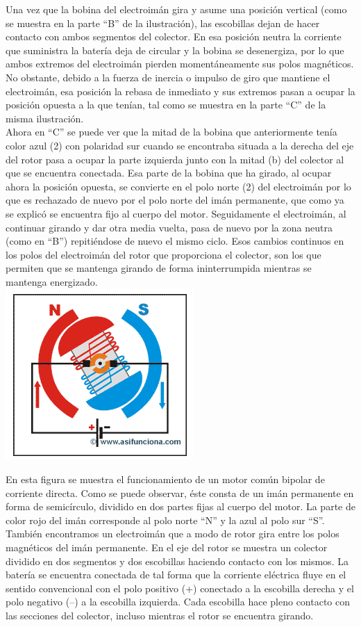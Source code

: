 \documentclass[10pt,a4paper]{article}
\begin{document}
Una vez que la bobina del electroimán gira y asume una posición vertical (como se muestra en la parte “B” de la ilustración), las escobillas dejan de hacer contacto con ambos segmentos del colector. En esa posición neutra la corriente que suministra la batería deja de circular y la bobina se desenergiza, por lo que ambos extremos del electroimán pierden momentáneamente sus polos magnéticos. No obstante, debido a la fuerza de inercia o impulso de giro que mantiene el electroimán, esa posición la rebasa de inmediato y sus extremos pasan a ocupar la posición opuesta a la que tenían, tal como se muestra en la parte “C” de la misma ilustración.\\

Ahora en “C” se puede ver que la mitad de la bobina que anteriormente tenía color azul (2) con polaridad sur cuando se encontraba situada a la derecha del eje del rotor pasa a ocupar la parte izquierda junto con la mitad (b) del colector al que se encuentra conectada. Esa parte de la bobina que ha girado, al ocupar ahora la posición opuesta, se convierte en el polo norte (2) del electroimán por lo que es rechazado de nuevo por el polo norte del imán permanente, que como ya se explicó se encuentra fijo al cuerpo del motor. Seguidamente el electroimán, al continuar girando y dar otra media vuelta, pasa de nuevo por la zona neutra (como en “B”) repitiéndose de nuevo el mismo ciclo. Esos cambios continuos en los polos del electroimán del rotor que proporciona el colector, son los que permiten que se mantenga girando de forma ininterrumpida mientras se mantenga energizado.\\
\centering
\includegraphics[scale=.80]{gi.png}\\
\raggedright
En esta figura se muestra el funcionamiento de un motor común bipolar de corriente directa. Como se puede observar, éste consta de un imán permanente en forma de semicírculo, dividido en dos partes fijas al cuerpo del motor. La parte de color rojo del imán corresponde al polo norte “N” y la azul al polo sur “S”. También encontramos un electroimán que a modo de rotor gira entre los polos magnéticos del imán permanente. En el eje del rotor se muestra un colector dividido en dos segmentos y dos escobillas haciendo contacto con los mismos. La batería se encuentra conectada de tal forma que la corriente eléctrica fluye en el sentido convencional con el polo positivo (+) conectado a la escobilla derecha y el polo negativo (–) a la escobilla izquierda. Cada escobilla hace pleno contacto con las secciones del colector, incluso mientras el rotor se encuentra girando.\\
\end{document}

